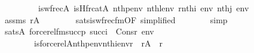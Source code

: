 \begin{isabellebody}
\ \ \ \ \ \ \ \ \ is{\isacharunderscore}{\kern0pt}wfrec{\isacharparenleft}{\kern0pt}{\isacharhash}{\kern0pt}{\isacharhash}{\kern0pt}A{\isacharcomma}{\kern0pt}\ is{\isacharunderscore}{\kern0pt}Hfrc{\isacharunderscore}{\kern0pt}at{\isacharparenleft}{\kern0pt}{\isacharhash}{\kern0pt}{\isacharhash}{\kern0pt}A{\isacharcomma}{\kern0pt}\ nth{\isacharparenleft}{\kern0pt}p{\isacharcomma}{\kern0pt}env{\isacharparenright}{\kern0pt}{\isacharcomma}{\kern0pt}\ nth{\isacharparenleft}{\kern0pt}l{\isacharcomma}{\kern0pt}env{\isacharparenright}{\kern0pt}{\isacharparenright}{\kern0pt}{\isacharcomma}{\kern0pt}\ r{\isacharcomma}{\kern0pt}nth{\isacharparenleft}{\kern0pt}i{\isacharcomma}{\kern0pt}\ env{\isacharparenright}{\kern0pt}{\isacharcomma}{\kern0pt}\ nth{\isacharparenleft}{\kern0pt}j{\isacharcomma}{\kern0pt}\ env{\isacharparenright}{\kern0pt}{\isacharparenright}{\kern0pt}{\isachardoublequoteclose}\isanewline
\ \ \ \ \ \ \isamarkupfalse%
\ assms\ {\isacartoucheopen}r{\isasymin}A{\isacartoucheclose}\isanewline
\ \ \ \ \ \ \ \ sats{\isacharunderscore}{\kern0pt}is{\isacharunderscore}{\kern0pt}wfrec{\isacharunderscore}{\kern0pt}fm{\isacharbrackleft}{\kern0pt}OF\ {}{\isacharbrackleft}{\kern0pt}simplified{\isacharbrackright}{\kern0pt}{\isacharbrackright}{\kern0pt}\isanewline
\ \ \ \ \ \ \isamarkupfalse%
\ simp\isanewline
\ \ \isacommand{{\isacharbraceright}{\kern0pt}}\isamarkupfalse%
\isanewline
\ \ \isamarkupfalse%
\isanewline
\ \ \isamarkupfalse%
\ {\isachardoublequoteopen}sats{\isacharparenleft}{\kern0pt}A{\isacharcomma}{\kern0pt}\ forcerel{\isacharunderscore}{\kern0pt}fm{\isacharparenleft}{\kern0pt}succ{\isacharparenleft}{\kern0pt}p{\isacharparenright}{\kern0pt}{\isacharcomma}{\kern0pt}\ succ{\isacharparenleft}{\kern0pt}i{\isacharparenright}{\kern0pt}{\isacharcomma}{\kern0pt}\ {}{\isacharparenright}{\kern0pt}{\isacharcomma}{\kern0pt}\ Cons{\isacharparenleft}{\kern0pt}r{\isacharcomma}{\kern0pt}\ env{\isacharparenright}{\kern0pt}{\isacharparenright}{\kern0pt}\ {\isasymlongleftrightarrow}\isanewline
\ \ \ \ \ \ \ \ is{\isacharunderscore}{\kern0pt}forcerel{\isacharparenleft}{\kern0pt}{\isacharhash}{\kern0pt}{\isacharhash}{\kern0pt}A{\isacharcomma}{\kern0pt}nth{\isacharparenleft}{\kern0pt}p{\isacharcomma}{\kern0pt}env{\isacharparenright}{\kern0pt}{\isacharcomma}{\kern0pt}nth{\isacharparenleft}{\kern0pt}i{\isacharcomma}{\kern0pt}env{\isacharparenright}{\kern0pt}{\isacharcomma}{\kern0pt}r{\isacharparenright}{\kern0pt}{\isachardoublequoteclose}\ \ {\isachardoublequoteopen}r{\isasymin}A{\isachardoublequoteclose}\ \ r\isanewline

\end{isabellebody}

